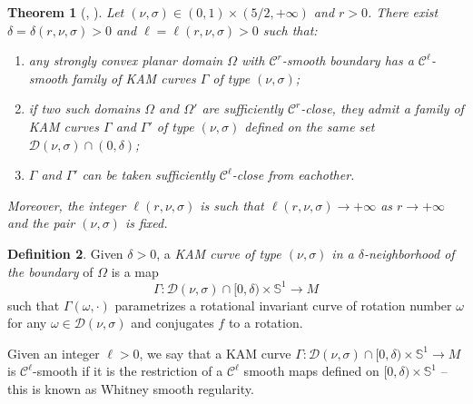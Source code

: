 \documentclass[12pt, openany]{amsart}
\newtheorem{theorem}{Theorem}%
\theoremstyle{definition}
\newtheorem{definition}[theorem]{Definition}
\theoremstyle{remark}
\theoremstyle{remark}
\theoremstyle{theorem}
\theoremstyle{theorem}
\theoremstyle{theorem}
\theoremstyle{theorem}
\renewcommand{\SS}{\mathbb{S}}
\begin{document}
\begin{theorem}[\cite{Douady, Lazutkin}, \cite{Poeschel1,Poeschel2}]
\label{theorem:KAM_general}
Let $(\nu,\sigma)\in(0,1)\times(5/2,+\infty)$ and $r>0$. There exist $\delta=\delta(r,\nu,\sigma)>0$ and $\ell=\ell(r,\nu,\sigma)>0$ such that:
\begin{enumerate}
\item any strongly convex planar domain  $\Omega$ with $\mathscr C^r$-smooth boundary has a $\mathscr C^{\ell}$-smooth family of KAM curves $\Gamma$ of type $(\nu,\sigma)$;
\item if two such domains $\Omega$ and $\Omega'$ are sufficiently $\mathscr C^r$-close, they admit a family of KAM curves $\Gamma$ and $\Gamma'$ of type $(\nu,\sigma)$ defined on the same set $\mathcal D(\nu,\sigma)\cap(0,\delta)$;
\item $\Gamma$ and $\Gamma'$ can be taken sufficiently $\mathscr C^{\ell}$-close from eachother.
\end{enumerate}
Moreover, the integer $\ell(r,\nu,\sigma)$ is such that $\ell(r,\nu,\sigma)\to+\infty$ as $r\to+\infty$ and the pair $(\nu,\sigma)$ is fixed.
\end{theorem}



\begin{definition}
Given $\delta>0$, a \textit{KAM curve of type $(\nu,\sigma)$ in a $\delta$-neighborhood of the boundary} of $\Omega$ is a map
\[
\Gamma:\mathcal D(\nu,\sigma)\cap[0,\delta) \times\SS^1 \to M
\]
such that $\Gamma(\omega,\cdot)$ parametrizes a rotational invariant curve of rotation number $\omega$ for any $\omega\in\mathcal D(\nu,\sigma)$  and conjugates $f$ to a rotation.
\end{definition}



Given an integer $\ell>0$, we say that a KAM curve $\Gamma:\mathcal D(\nu,\sigma)\cap[0,\delta) \times\SS^1 \to M$ is {$\mathscr C^{\ell}$-smooth} if it is the restriction of a $\mathscr C^{\ell}$ smooth maps defined on $[0,\delta) \times\SS^1$ -- this is known as Whitney smooth regularity. 
\end{document}
